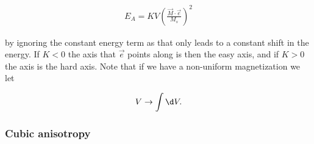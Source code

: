 \begin{align}
E_A = K V (\frac{\vec{M}\cdot\vec{e}}{M_s})^2
\end{align}

by ignoring the constant energy term as that only leads to a constant shift in the energy. If $K < 0$ the axis that $\vec{e}$ points along is then the easy axis, and if $K > 0$ the axis is the hard axis. Note that if we have a non-uniform magnetization we let

\begin{align*}
V \rightarrow \int \d V.
\end{align*}

\subsubsection{Cubic anisotropy}